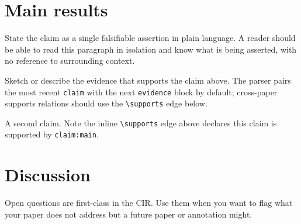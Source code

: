 \documentclass{rrxiv}
\begin{document}
\section{Main results}
\label{sec:results}

\begin{claim}
\label{claim:main}
State the claim as a single falsifiable assertion in plain language.
A reader should be able to read this paragraph in isolation and know
what is being asserted, with no reference to surrounding context.
\end{claim}

\begin{evidence}
\label{ev:main}
Sketch or describe the evidence that supports the claim above. The
parser pairs the most recent \texttt{claim} with the next
\texttt{evidence} block by default; cross-paper supports relations
should use the \texttt{\textbackslash supports} edge below.
\end{evidence}



\begin{claim}
\label{claim:secondary}
A second claim. Note the inline \texttt{\textbackslash supports} edge
above declares this claim is supported by \texttt{claim:main}.
\end{claim}

\section{Discussion}
\label{sec:discussion}

\begin{openquestion}
\label{oq:scaling}
Open questions are first-class in the CIR. Use them when you want to
flag what your paper does not address but a future paper or annotation
might.
\end{openquestion}
\end{document}
